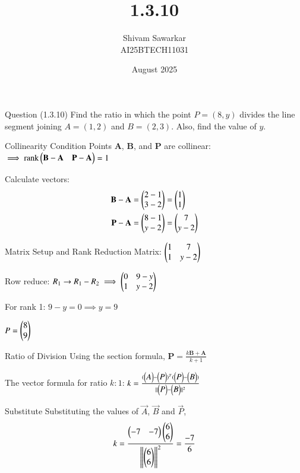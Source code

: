 \documentclass{beamer}
\title %
{1.3.10}
\date{August  2025}
\author %
{Shivam Sawarkar \\ AI25BTECH11031}
\begin{document}
\frame{\titlepage}
\begin{frame}{Question (1.3.10)}
Find the ratio in which the point $P = (8, y)$ divides the line segment joining
$A = (1, 2)$ and $B = (2, 3)$. Also, find the value of $y$.
\end{frame}


\begin{frame}{Collinearity Condition}
Points \textbf{A}, \textbf{B}, and \textbf{P} are collinear:
$
\implies \text{rank} \begin{pmatrix}\mathbf{B} - \mathbf{A} & \mathbf{P} - \mathbf{A}\end{pmatrix}  = 1
$

Calculate vectors:
\begin{align*}
\textbf{B} - \textbf{A} &= \begin{pmatrix}2 - 1 \\ 3 - 2\end{pmatrix} = \begin{pmatrix}1 \\ 1\end{pmatrix} \\
\textbf{P} - \textbf{A} &= \begin{pmatrix}8 - 1 \\ y - 2\end{pmatrix} = \begin{pmatrix}7 \\ y - 2\end{pmatrix}
\end{align*}
\end{frame}

\begin{frame}{Matrix Setup and Rank Reduction}
Matrix:
$
\begin{pmatrix}
1 & 7 \\
1 & y - 2\end{pmatrix}
$

Row reduce:
$
R_1 \rightarrow R_1 - R_2 \implies
\begin{pmatrix}
0 & 9 - y \\
1 & y - 2\end{pmatrix}
$

For rank 1:
$
9 - y = 0 \implies y = 9
$

$
P = \begin{pmatrix}8 \\ 9\end{pmatrix}
$
\end{frame}

\begin{frame}{Ratio of Division}
Using the section formula,
$
\textbf{P} = \frac{k \textbf{B} + \textbf{A}}{k+1}
$

The vector formula for ratio \(k:1\):
$
k = \frac{(\begin{pmatrix}A\end{pmatrix} - \begin{pmatrix}P\end{pmatrix})^T (\begin{pmatrix}P\end{pmatrix} - \begin{pmatrix}B\end{pmatrix})}{\|\begin{pmatrix}P\end{pmatrix} - \begin{pmatrix}B\end{pmatrix}\|^2}
$
\end{frame}

\begin{frame}{Substitute}
Substituting the values of $\vec{A}$, $\vec{B}$ and $\vec{P}$,
\begin{align}
k=\frac{\begin{pmatrix}-7 & -7\end{pmatrix}\begin{pmatrix}6 \\ 6\end{pmatrix}}{\left\lVert\begin{pmatrix}6 \\ 6\end{pmatrix}\right\rVert^2}=\frac{-7}{6}
\end{align}
\end{frame}
\end{document}
